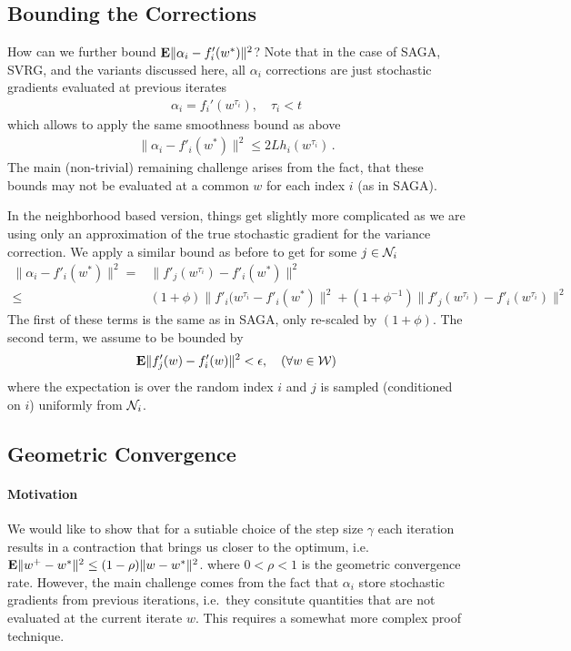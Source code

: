 \documentclass{article}
\newcommand{\E}{{\bf E}}
\newcommand{\w}{w}
\begin{document}
\subsection{Bounding the Corrections} 

How can we further bound  $\E \| \alpha_i - f_i'(w^*) \|^2$? Note that in the case of SAGA, SVRG, and the variants discussed here, all $\alpha_i$ corrections are just stochastic gradients evaluated at previous iterates 
\begin{align}
\alpha_i = f_i'(w^{\tau_i}), \quad \tau_i < t
\end{align}
which allows to apply the same smoothness bound  as above 
\begin{align}
\| \alpha_i-f'_i(w^*)\|^2 \le 2L  h_i(w^{\tau_i}) \,.
\label{eq:alpha-bound}
\end{align}
The main (non-trivial) remaining challenge arises from the fact, that these bounds may not be evaluated at a common $\w$ for each index $i$ (as in SAGA). 

In the neighborhood based version, things get slightly more complicated as we are using only an approximation of the true stochastic gradient for the variance correction. We apply a similar bound as before to get for some $j \in {\cal N}_i$
\begin{align}
\| \alpha_i-f'_i(w^*)\|^2 = & \| f'_j(w^{\tau_i}) - f'_i(w^*) \|^2 \\
\le & (1+\phi) \| f'_i(w^{\tau_i} - f'_i(w^*)\|^2 + (1+\phi^{-1}) \|  f'_j(w^{\tau_i}) - f'_i(w^{\tau_i}) \|^2 
\nonumber
\label{eq:clustered-split}
\end{align}
The first of these terms is the same as in SAGA, only re-scaled by $(1+\phi)$. The second term, we assume to be bounded by
\begin{align}
\E \| f'_j(w) - f_i'(w) \|^2  < \epsilon, \quad (\forall w \in {\cal W})
\end{align}
where the expectation is over the random index $i$ and $j$ is sampled (conditioned on $i$) uniformly from ${\cal N}_i$.  

\subsection{Geometric Convergence} 

\paragraph{Motivation} 
We would like to show that for a sutiable choice of the step size $\gamma$ each iteration results in a contraction that brings us closer to the optimum, i.e.~$\E \| w^+ - w^*\|^2 \le (1-\rho) \| w - w^*\|^2$. where $0 < \rho <1$ is the geometric convergence rate. However, the main challenge comes from the fact that $\alpha_i$ store stochastic gradients from previous iterations, i.e.~they consitute quantities that are not evaluated at the current iterate $w$. This requires a somewhat more complex proof technique. 
\end{document}
